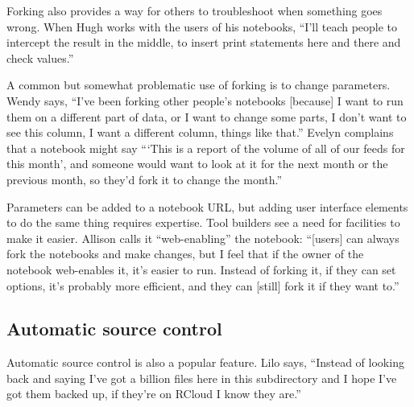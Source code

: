 Forking also provides a way for others to troubleshoot when something goes
wrong.  When Hugh works with the users of his notebooks, ``I'll teach people
to intercept the result in the middle, to insert print statements here and
there and check values.''



A common but somewhat problematic use of forking is to change
parameters. Wendy says, ``I've been forking other people's notebooks [because] I
want to run them on a different part of data, or I want to change some parts,
I don't want to see this column, I want a different column, things like
that.''  Evelyn complains that a notebook might say ```This is a report of
the volume of all of our feeds for this month', and someone would want to
look at it for the next month or the previous month, so they'd fork it to
change the month.''

Parameters can be added to a notebook URL, but adding user interface
elements to do the same thing requires expertise. Tool builders see a
need for facilities to make it easier. Allison calls it ``web-enabling'' the
notebook: ``[users] can always fork the notebooks and make changes, but I
feel that if the owner of the notebook web-enables it, it's easier to
run. Instead of forking it, if they can set options, it's probably more
efficient, and they can [still] fork it if they want to.''


\subsection{Automatic source control}

Automatic source control is also a popular feature. Lilo says, ``Instead of
looking back and saying I've got a billion files here in this subdirectory and I
hope I've got them backed up, if they're on RCloud I know they are.''

